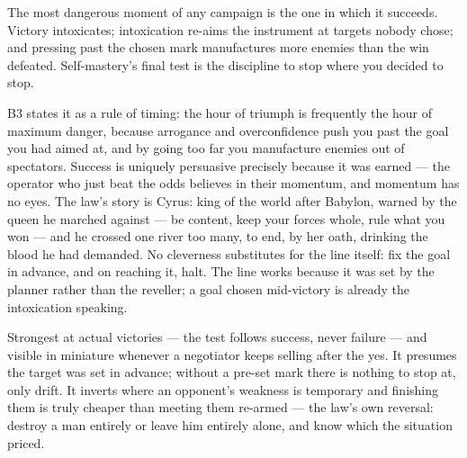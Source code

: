 

\begin{core}
The most dangerous moment of any campaign is the one in which it succeeds. Victory intoxicates; intoxication re-aims the instrument at targets nobody chose; and pressing past the chosen mark manufactures more enemies than the win defeated. Self-mastery's final test is the discipline to stop where you decided to stop.
\end{core}
\begin{mechanism}
B3 states it as a rule of timing: the hour of triumph is frequently the hour of maximum danger, because arrogance and overconfidence push you past the goal you had aimed at, and by going too far you manufacture enemies out of spectators. Success is uniquely persuasive precisely because it was earned --- the operator who just beat the odds believes in their momentum, and momentum has no eyes. The law's story is Cyrus: king of the world after Babylon, warned by the queen he marched against --- be content, keep your forces whole, rule what you won --- and he crossed one river too many, to end, by her oath, drinking the blood he had demanded. No cleverness substitutes for the line itself: fix the goal in advance, and on reaching it, halt. The line works because it was set by the planner rather than the reveller; a goal chosen mid-victory is already the intoxication speaking.
\end{mechanism}
\begin{conditions}
Strongest at actual victories --- the test follows success, never failure --- and visible in miniature whenever a negotiator keeps selling after the yes. It presumes the target was set in advance; without a pre-set mark there is nothing to stop at, only drift. It inverts where an opponent's weakness is temporary and finishing them is truly cheaper than meeting them re-armed --- the law's own reversal: destroy a man entirely or leave him entirely alone, and know which the situation priced.
\end{conditions}
